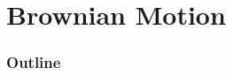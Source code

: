 


\newcommand{\RR}{\mathbf R}
\newcommand{\CC}{\mathbf C}
\newcommand{\ZZ}{\mathbf Z}
\newcommand{\ZZn}[1]{\ZZ/{#1}\ZZ}
\newcommand{\QQ}{\mathbf Q}
\newcommand{\rr}{\mathbb R}
\newcommand{\cc}{\mathbb C}
\newcommand{\zz}{\mathbb Z}
\newcommand{\zzn}[1]{\zz/{#1}\zz}
\newcommand{\qq}{\mathbb Q}
\newcommand{\calM}{\mathcal M}
\newcommand{\latex}{\LaTeX}
\newcommand{\tex}{\TeX}
\newcommand{\sm}{\setminus} 

\newcommand{\tfix}{\rule{0pt}{2.6ex}}
\newcommand{\bfix}{\rule[-1.2ex]{0pt}{0pt}}



\newcommand{\intf}[1]{\int_a^b{#1}\,dx}
\newcommand{\intfb}[3]{\int_{#1}^{#2}{#3}\,dx}
\newcommand{\marginalfootnote}[1]{%
        \footnote{#1}
        \marginpar[\hfill{\sf\thefootnote}]{{\sf\thefootnote}}}
\newcommand{\edit}[1]{\marginalfootnote{#1}}


\newcommand{\Tr}{\operatorname {Tr}}
\newcommand{\GL}{\operatorname {GL}}
\newcommand{\SL}{\operatorname {SL}}
\newcommand{\Prob}{\operatorname {Prob}}
\newcommand{\re}{\operatorname {Re}}
\newcommand{\im}{\operatorname {Im}}






\section{Brownian Motion}
\begin{frame}
  \frametitle{Outline}
  \tableofcontents[ currentsection ]
\end{frame}

